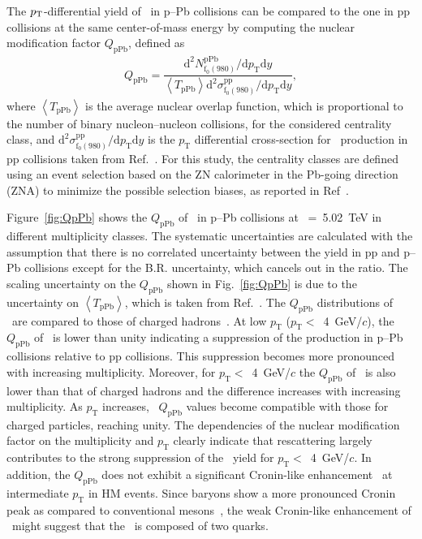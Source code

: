 The $p_{\rm{T}}$-differential yield of \fzero~in p--Pb collisions can be compared to the one in pp collisions at the same center-of-mass energy by computing the nuclear modification factor $Q_{\mbox{pPb}}$, defined as 
\begin{eqnarray}
Q_{\mbox{pPb}} = \dfrac{\mathrm{d}^{2} N_{\mathrm{f}_{0}(980)}^{\mathrm{pPb}} / \mathrm{d} p_{\mathrm{T}} \mathrm{d}y }{ \left\langle T_{\mathrm{pPb}} \right\rangle \mathrm{d}^{2} \sigma_{\mathrm{f}_{0}(980)}^{\mathrm{pp}}/ \mathrm{d} p_{\mathrm{T}} \mathrm{d}y },
\end{eqnarray}
where $\left\langle T_{\mathrm{pPb}} \right\rangle$ is the average nuclear overlap function, which is proportional to the number of binary nucleon--nucleon collisions, for the considered centrality class, and $\mathrm{d}^{2} \sigma_{\mathrm{f}_{0}(980)}^{\mathrm{pp}}/ \mathrm{d} p_{\mathrm{T}} \mathrm{d}y$ is the $p_{\mathrm{T}}$ differential cross-section for \fzero~production in pp collisions taken from Ref.~\cite{ALICE:2022qnb}. For this study, the centrality classes are defined using an event selection based on the ZN calorimeter in the Pb-going direction (ZNA) to minimize the possible selection biases, as reported in Ref~\cite{ALICE:2014xsp}.

Figure~\ref{fig:QpPb} shows the $Q_{\mbox{pPb}}$ of \fzero~in p--Pb collisions at \snn~=~5.02~TeV in different multiplicity classes. The systematic uncertainties are calculated with the assumption that there is no correlated uncertainty between the yield in pp and p--Pb collisions except for the B.R. uncertainty, which cancels out in the ratio. The scaling uncertainty on the $Q_{\mbox{pPb}}$ shown in Fig.~\ref{fig:QpPb} is due to the uncertainty on $\left\langle T_{\mathrm{pPb}} \right\rangle$, which is taken from Ref.~\cite{ALICE:2014xsp}. The $Q_{\mbox{pPb}}$ distributions of \fzero~are compared to those of charged hadrons~\cite{ALICE:2014xsp}. At low $p_{\mathrm{T}}$ ($p_{\mathrm{T}}<$~4~GeV/$c$), the $Q_{\mbox{pPb}}$ of \fzero~is lower than unity indicating a suppression of the production in p--Pb collisions relative to pp collisions. This suppression becomes more pronounced with increasing multiplicity. Moreover, for $p_{\mathrm{T}}<$~4~GeV/$c$ the $Q_{\mbox{pPb}}$ of \fzero~is also lower than that of charged hadrons and the difference increases with increasing multiplicity. As $p_{\mathrm{T}}$ increases, \fzero~$Q_{\mbox{pPb}}$ values become compatible with those for charged particles, reaching unity. The dependencies of the nuclear modification factor on the multiplicity and $p_{\mathrm{T}}$ clearly indicate that rescattering largely contributes to the strong suppression of the \fzero~yield for $p_{\mathrm{T}}<$~4~GeV/$c$. In addition, the $Q_{\mbox{pPb}}$ does not exhibit a significant Cronin-like enhancement~\cite{Cronin:1974zm} at intermediate $p_{\mathrm{T}}$ in HM events. Since baryons show a more pronounced Cronin peak as compared to conventional mesons~\cite{ALICE:2016dei, Foka:2016zdb}, the weak Cronin-like enhancement of \fzero~might suggest that the \fzero~is composed of two quarks.